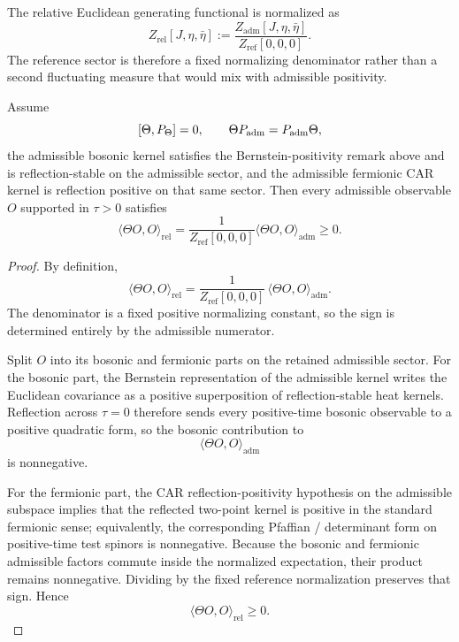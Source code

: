 \begin{definition}
\label{def:relative-generating-functional}
The relative Euclidean generating functional is normalized as
\[
Z_{\mathrm{rel}}[J,\eta,\bar\eta]
:=
\frac{Z_{\mathrm{adm}}[J,\eta,\bar\eta]}{Z_{\mathrm{ref}}[0,0,0]}.
\]
The reference sector is therefore a fixed normalizing denominator rather than a second fluctuating measure that would mix with admissible positivity.
\end{definition}

\begin{lemma}
\label{lem:admissible-reflection-positivity}
Assume
\[
[\Theta,P_\Theta]=0,
\qquad
\Theta P_{\mathrm{adm}}=P_{\mathrm{adm}}\Theta,
\]
the admissible bosonic kernel satisfies the Bernstein-positivity remark above and is
reflection-stable on the admissible sector, and the
admissible fermionic CAR kernel is reflection positive on that same sector. Then every
admissible observable $O$ supported in $\tau>0$ satisfies
\[
\langle \Theta O,O\rangle_{\mathrm{rel}}
=
\frac{1}{Z_{\mathrm{ref}}[0,0,0]}
\langle \Theta O,O\rangle_{\mathrm{adm}}
\ge 0.
\]
\end{lemma}

\begin{proof}
By definition,
\[
\langle \Theta O,O\rangle_{\mathrm{rel}}
=
\frac{1}{Z_{\mathrm{ref}}[0,0,0]}\,
\langle \Theta O,O\rangle_{\mathrm{adm}}.
\]
The denominator is a fixed positive normalizing constant, so the sign is determined entirely by the
admissible numerator.

Split $O$ into its bosonic and fermionic parts on the retained admissible sector. For the bosonic
part, the Bernstein representation of the admissible kernel writes the Euclidean covariance as a
positive superposition of reflection-stable heat kernels. Reflection across $\tau=0$ therefore sends
every positive-time bosonic observable to a positive quadratic form, so the bosonic contribution to
\[
\langle \Theta O,O\rangle_{\mathrm{adm}}
\]
is nonnegative.

For the fermionic part, the CAR reflection-positivity hypothesis on the admissible subspace implies
that the reflected two-point kernel is positive in the standard fermionic sense; equivalently, the
corresponding Pfaffian / determinant form on positive-time test spinors is nonnegative. Because the
bosonic and fermionic admissible factors commute inside the normalized expectation, their product
remains nonnegative. Dividing by the fixed reference normalization preserves that sign. Hence
\[
\langle \Theta O,O\rangle_{\mathrm{rel}}\ge 0.
\]
\end{proof}

